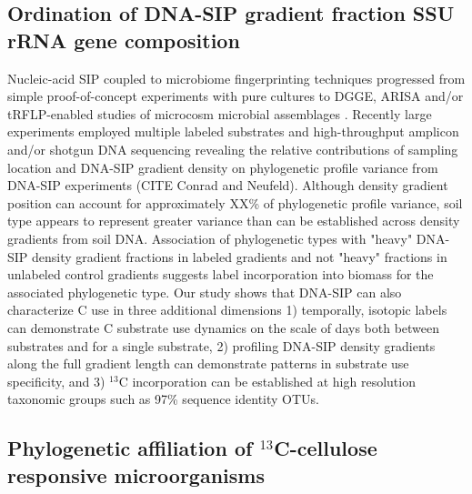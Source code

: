 \subsection{Ordination of DNA-SIP gradient fraction SSU rRNA gene composition}\label{ord}
Nucleic-acid SIP coupled to microbiome fingerprinting techniques progressed
from simple proof-of-concept experiments with pure cultures
\citep{radajewski2000stable} to DGGE, ARISA and/or tRFLP-enabled studies of
microcosm microbial assemblages \citep{Haichar_2007}. Recently large
experiments employed multiple labeled substrates and high-throughput amplicon
and/or shotgun DNA sequencing \citep{Verastegui_2014} revealing the relative
contributions of sampling location and DNA-SIP gradient density on phylogenetic
profile variance from DNA-SIP experiments (CITE Conrad and Neufeld). Although
density gradient position can account for approximately XX\% of phylogenetic
profile variance, soil type appears to represent greater variance than can be
established across density gradients from soil DNA. Association of phylogenetic
types with "heavy" DNA-SIP density gradient fractions in labeled gradients and
not "heavy" fractions in unlabeled control gradients suggests label
incorporation into biomass for the associated phylogenetic type. Our study
shows that DNA-SIP can also characterize C use in three additional 
dimensions 1) temporally, isotopic labels can demonstrate C substrate use
dynamics on the scale of days both between substrates and for a single
substrate, 2) profiling DNA-SIP density gradients along the full gradient
length can demonstrate patterns in substrate use specificity, and 3) $^{13}$C
incorporation can be established at high resolution taxonomic groups such
as 97\% sequence identity OTUs.

\subsection{Phylogenetic affiliation of $^{13}$C-cellulose responsive
microorganisms}
